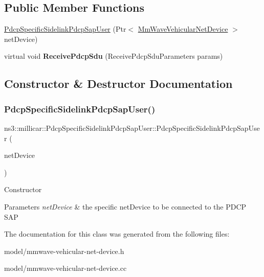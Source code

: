 \subsection*{Public Member Functions}
\begin{DoxyCompactItemize}
\item 
\hyperlink{classns3_1_1millicar_1_1PdcpSpecificSidelinkPdcpSapUser_a010c7015eba9f2c373951760934ba8d9}{Pdcp\+Specific\+Sidelink\+Pdcp\+Sap\+User} (Ptr$<$ \hyperlink{classns3_1_1millicar_1_1MmWaveVehicularNetDevice}{Mm\+Wave\+Vehicular\+Net\+Device} $>$ net\+Device)
\item 
\mbox{\label{classns3_1_1millicar_1_1PdcpSpecificSidelinkPdcpSapUser_a6ab83cbac459ceebae9434080d99b194}} 
virtual void {\bfseries Receive\+Pdcp\+Sdu} (Receive\+Pdcp\+Sdu\+Parameters params)
\end{DoxyCompactItemize}


\subsection{Constructor \& Destructor Documentation}
\mbox{\label{classns3_1_1millicar_1_1PdcpSpecificSidelinkPdcpSapUser_a010c7015eba9f2c373951760934ba8d9}} 
\subsubsection{\texorpdfstring{Pdcp\+Specific\+Sidelink\+Pdcp\+Sap\+User()}{PdcpSpecificSidelinkPdcpSapUser()}}
{\footnotesize\ttfamily ns3\+::millicar\+::\+Pdcp\+Specific\+Sidelink\+Pdcp\+Sap\+User\+::\+Pdcp\+Specific\+Sidelink\+Pdcp\+Sap\+User (\begin{DoxyParamCaption}\item[{Ptr$<$ \hyperlink{classns3_1_1millicar_1_1MmWaveVehicularNetDevice}{Mm\+Wave\+Vehicular\+Net\+Device} $>$}]{net\+Device }\end{DoxyParamCaption})}

Constructor


\begin{DoxyParams}{Parameters}
{\em net\+Device} & the specific net\+Device to be connected to the P\+D\+CP S\+AP \\
\hline
\end{DoxyParams}


The documentation for this class was generated from the following files\+:\begin{DoxyCompactItemize}
\item 
model/mmwave-\/vehicular-\/net-\/device.\+h\item 
model/mmwave-\/vehicular-\/net-\/device.\+cc\end{DoxyCompactItemize}
